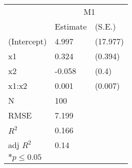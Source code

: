 \begin{tabular}{*{3}{l}}
 \hline
                &\multicolumn{2}{c}{M1}   \\
                &Estimate &(S.E.) \\
 \hline
 \hline
  (Intercept)    &  4.997  &   (17.977) \\
  x1             &  0.324  &   (0.394) \\
  x2             & -0.058  &   (0.4) \\
  x1:x2          &  0.001  &   (0.007) \\
 \hline 
 N                &100      &       \\
 RMSE            &7.199        & \\
 $R^2$           &0.166        & \\
 adj $R^2$       &0.14        & \\
 \hline
 \hline
 
 \multicolumn{2}{l}{${*}  p \le 0.05$   }\\
 \end{tabular}